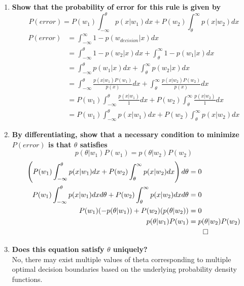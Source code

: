\documentclass[12pt]{article}
\begin{document}
\begin{enumerate}
  \begin{enumerate}
  \item \textbf{Show that the probability of error for this rule is given by}
    \begin{equation}
      P(error) = P(w_1)\int_{-\infty}^\theta p(x|w_1)dx + P(w_2) \int_\theta^\infty p(x|w_2)dx
    \end{equation}
    \begin{equation}
    \begin{split}
      P(error)& = \int_{-\infty}^\infty 1-p(w_{decision}|x)dx \\
      & = \int_{-\infty}^\theta 1-p(w_2|x)dx + \int_\theta^\infty 1-p(w_1|x)dx \\
      & = \int_{-\infty}^\theta p(w_1|x)dx + \int_\theta^\infty p(w_2|x)dx \\
      & = \int_{-\infty}^\theta \frac{p(x|w_1)P(w_1)}{p(x)}dx + \int_\theta^\infty \frac{p(x|w_2)P(w_2)}{p(x)}dx \\
      & = P(w_1)\int_{-\infty}^\theta \frac{p(x|w_1)}{1}dx + P(w_2)\int_\theta^\infty \frac{p(x|w_2)}{1}dx \\
      & \boxed{= P(w_1)\int_{-\infty}^\theta p(x|w_1)dx + P(w_2) \int_\theta^\infty p(x|w_2)dx}
    \end{split}
    \end{equation}
  \item \textbf{By differentiating, show that a necessary condition to minimize $P(error)$ is that $\theta$ satisfies}
    \begin{equation}
      p(\theta|w_1)P(w_1)=p(\theta|w_2)P(w_2)
    \end{equation}
    \begin{equation}
    \begin{split}
      \left(P(w_1)\int_{-\infty}^\theta p(x|w_1)dx + P(w_2) \int_\theta^\infty p(x|w_2)dx\right) d\theta& = 0 \\
      P(w_1)\int_{-\infty}^\theta p(x|w_1)dxd\theta + P(w_2) \int_\theta^\infty p(x|w_2)dxd\theta& = 0 \\
      P(w_1)(-p(\theta|w_1)) + P(w_2)(p(\theta|w_2))& = 0 \\
      p(\theta|w_1)P(w_1)& =p(\theta|w_2)P(w_2) \\
      & \qed
    \end{split}
    \end{equation}
  \item \textbf{Does this equation satisfy $\theta$ uniquely?} \\
    No, there may exist multiple values of theta corresponding to multiple optimal decision boundaries based on the underlying probability density functions.

\end{enumerate}
\end{enumerate}
\end{document}
